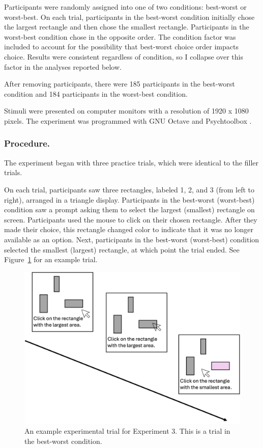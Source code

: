 Participants were randomly assigned into one of two conditions: best-worst or worst-best. On each trial, participants in the best-worst condition initially chose the largest rectangle and then chose the smallest rectangle. Participants in the worst-best condition chose in the opposite order. The condition factor was included to account for the possibility that best-worst choice order impacts choice. Results were consistent regardless of condition, so I collapse over this factor in the analyses reported below.

After removing participants, there were 185 participants in the best-worst condition and 184 participants in the worst-best condition.

Stimuli were presented on computer monitors with a resolution of 1920 x 1080 pixels. The experiment was programmed with GNU Octave and Psychtoolbox \parencite{octave,brainardPsychophysicsToolbox1997}. 

\subsubsection{Procedure.}

The experiment began with three practice trials, which were identical to the filler trials. 

On each trial, participants saw three rectangles, labeled 1, 2, and 3 (from left to right), arranged in a triangle display. Participants in the best-worst (worst-best) condition saw a prompt asking them to select the largest (smallest) rectangle on screen. Participants used the mouse to click on their chosen rectangle. After they made their choice, this rectangle changed color to indicate that it was no longer available as an option. Next, participants in the best-worst (worst-best) condition selected the smallest (largest) rectangle, at which point the trial ended. See Figure~\ref{fig:bw_example_trial} for an example trial.

\begin{figure}
   \includegraphics[width=\linewidth]{figures/bw_design_fig.jpg}
   \caption{An example experimental trial for Experiment 3. This is a trial in the best-worst condition.}
   \label{fig:bw_example_trial}
 \end{figure}
 
